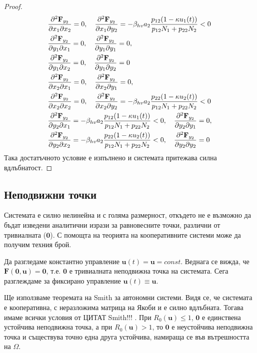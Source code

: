 \begin{proof}
{\begin{align*}
    &\pdv{\mathbf{F}_{y_2}}{x_1}{x_2} = 0, \quad
    \pdv{\mathbf{F}_{y_2}}{x_1}{y_2} = -\beta_{hv} a_2 \frac{p_{12} (1-\kappa u_1(t))}{p_{12} N_1 + p_{22} N_2} < 0 \\
    &\pdv{\mathbf{F}_{y_2}}{y_1}{x_1} = 0, \quad
    \pdv{\mathbf{F}_{y_2}}{y_1}{y_1} = 0, \\
    &\pdv{\mathbf{F}_{y_2}}{y_1}{x_2} = 0, \quad
    \pdv{\mathbf{F}_{y_2}}{y_1}{y_2} = 0 \\
    &\pdv{\mathbf{F}_{y_2}}{x_2}{x_1} = 0, \quad
    \pdv{\mathbf{F}_{y_2}}{x_2}{y_1} = 0, \\
    &\pdv{\mathbf{F}_{y_2}}{x_2}{x_2} = 0, \quad
    \pdv{\mathbf{F}_{y_2}}{x_2}{y_2} = -\beta_{hv} a_2 \frac{p_{22} (1-\kappa u_2(t))}{p_{12} N_1 + p_{22} N_2} < 0 \\
    &\pdv{\mathbf{F}_{y_2}}{y_2}{x_1} = -\beta_{hv} a_2 \frac{p_{12} (1-\kappa u_1(t))}{p_{12} N_1 + p_{22} N_2} < 0, \quad
    \pdv{\mathbf{F}_{y_2}}{y_2}{y_1} = 0, \\
    &\pdv{\mathbf{F}_{y_2}}{y_2}{x_2} = -\beta_{hv} a_2 \frac{p_{22} (1-\kappa u_2(t))}{p_{12} N_1 + p_{22} N_2} < 0, \quad
    \pdv{\mathbf{F}_{y_2}}{y_2}{y_2} = 0
  \end{align*}
}
Така достатъчното условие е изпълнено и системата притежава силна вдлъбнатост.
\end{proof}


\subsection{Неподвижни точки}
Системата е силно нелинейна и с голяма размерност, откъдето не е възможно да бъдат изведени аналитични изрази за равновесните точки, различни от тривиалната ($\mathbf{0}$). С помощта на теорията на кооперативните системи може да получим техния брой.

Да разгледаме константно управление $\mathbf{u}(t)=\mathbf{u}=const$. Веднага се вижда, че $\mathbf{F}(\mathbf{0}, \mathbf{u}) = \mathbf{0}$, т.е. $\mathbf{0}$ е тривиалната неподвижна точка на системата.
Сега разглеждаме за фиксирано управление $\mathbf{u}(t) \equiv \mathbf{u}$.

Ще използваме теоремата на Smith за автономни системи. Видя се, че системата е кооперативна, с неразложима матрица на Якоби и е силно вдлъбната. Тогава имаме всички условия от
\color{Red} ЦИТАТ Smith!!!
\color{Black}
.
При $R_0(\mathbf{u}) \leq 1$, $\mathbf{0}$ е единствена устойчива неподвижна точка, а при $R_0(\mathbf{u}) > 1$, то $\mathbf{0}$ е неустойчива неподвижна точка и съществува точно една друга устойчива, намираща се във вътрешността на $\Omega$.

